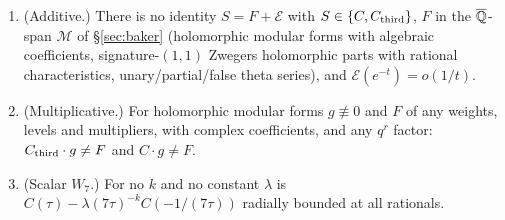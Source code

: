 \begin{theorem}\label{thm:E}
\begin{enumerate}[label=(\roman*)]
\item (Additive.) There is no identity $S=F+\mathcal E$ with $S\in\{C,C_{\mathrm{third}}\}$, $F$ in the $\overline{\mathbb{Q}}$-span
$\mathcal M$ of \S\ref{sec:baker} (holomorphic modular forms with algebraic coefficients, signature-$(1,1)$
Zwegers holomorphic parts with rational characteristics, unary/partial/false theta series), and
$\mathcal E(e^{-t})=o(1/t)$.
\item (Multiplicative.) For holomorphic modular forms $g\not\equiv0$ and $F$ of any weights, levels and
multipliers, with complex coefficients, and any $q^r$ factor: $C_{\mathrm{third}}\cdot g\neq F$ and $C\cdot g\neq F$.
\item (Scalar $W_7$.) For no $k$ and no constant $\lambda$ is
$C(\tau)-\lambda(7\tau)^{-k}C(-1/(7\tau))$ radially bounded at all rationals.
\end{enumerate}
\end{theorem}

